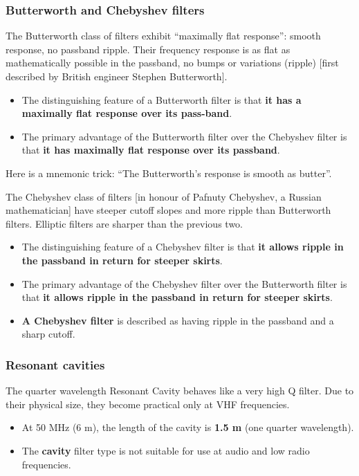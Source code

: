 \documentclass[letterpaper]{article}
\begin{document}
        \subsubsection{Butterworth and Chebyshev filters}
        The Butterworth class of filters exhibit ``maximally flat response'': smooth response, no passband ripple.
        Their frequency response is as flat as mathematically possible in the passband, no bumps or variations (ripple) [first described by British engineer Stephen Butterworth].
        \begin{itemize}
            \item The distinguishing feature of a Butterworth filter is that \textbf{it has a maximally flat response over its pass-band}.
            \item The primary advantage of the Butterworth filter over the Chebyshev filter is that \textbf{it has maximally flat response over its passband}.
        \end{itemize}
        Here is a mnemonic trick: ``The Butterworth's response is smooth as butter''.

        The Chebyshev class of filters [in honour of Pafnuty Chebyshev, a Russian mathematician] have steeper cutoff slopes and more ripple than Butterworth filters.
        Elliptic filters are sharper than the previous two.
        \begin{itemize}
            \item The distinguishing feature of a Chebyshev filter is that \textbf{it allows ripple in the passband in return for steeper skirts}.
            \item The primary advantage of the Chebyshev filter over the Butterworth filter is that \textbf{it allows ripple in the passband in return for steeper skirts}.
            \item \textbf{A Chebyshev filter} is described as having ripple in the passband and a sharp cutoff.
        \end{itemize}

        \subsubsection{Resonant cavities}
        The quarter wavelength Resonant Cavity behaves like a very high Q filter.
        Due to their physical size, they become practical only at VHF frequencies.
        \begin{itemize}
            \item At 50 MHz (6 m), the length of the cavity is \textbf{1.5 m} (one quarter wavelength).
            \item The \textbf{cavity} filter type is not suitable for use at audio and low radio frequencies.
        \end{itemize}
\end{document}
